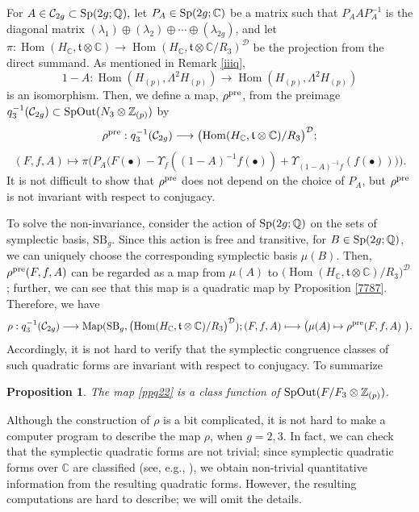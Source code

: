 \documentclass{article}
\theoremstyle{plain}
\newtheorem{prop}[thm]{Proposition}
\theoremstyle{definition}
\def\Hom{\mathop{\mathrm{Hom}}\nolimits}
\newcommand{\lra}{\longrightarrow}
\newcommand{\ra}{\rightarrow}
\newcommand{\Q}{{\Bbb Q}}
\newcommand{\Z}{{\Bbb Z}}
\newcommand{\Sp}{{\rm Sp}}
\newcommand{\SpOut}{{\rm SpOut}}
\begin{document}
{For $A \in \mathcal{C}_{2g} \subset \Sp(2g;\Q), $ let $P_A \in \Sp( 2g;\mathbb{C})$ be a matrix such that $ P_A A P_A^{-1}$ is the diagonal matrix $(\lambda_1) \oplus (\lambda_2)\oplus\cdots \oplus (\lambda_{2g})$, and let $\pi: \Hom(H_{\mathbb{C}}, \mathfrak{t}\otimes \mathbb{C} ) \ra \Hom(H_{\mathbb{C}}, \mathfrak{t}\otimes \mathbb{C} /R_3)^{\mathcal{D}}$ be the projection from the direct summand. As mentioned in Remark \ref{iiiq}, 
\[1-A: \Hom( H_{(p)}, \Lambda^2 H_{(p)} ) \lra \Hom( H_{(p)}, \Lambda^2 H_{(p)} )\]
is an isomorphism. Then, we define a map, $\rho^{\rm pre}$, from the preimage $q_3^{-1}(\mathcal{C}_{2g} ) \subset \mathrm{SpOut}( N_3 \otimes \Z_{(p)} )$ by
\[\rho^{\rm pre}: q_3^{-1}(\mathcal{C}_{2g} ) \lra \bigl( \Hom(H_{\mathbb{C}}, \mathfrak{t}\otimes \mathbb{C} ) /R_3\bigr)^{\mathcal{D}}; \]
\[ (F,f,A) \longmapsto \pi \bigl(P_A \bigl(F(\bullet) -\Upsilon_f((1-A)^{-1} f(\bullet))+ \Upsilon_{(1-A)^{-1}f}(f (\bullet)) \bigr) \bigr). \]
It is not difficult to show that $\rho^{\rm pre} $ does not depend on the choice of $ P_A$, but $\rho^{\rm pre} $ is not invariant with respect to conjugacy.



To solve the non-invariance, consider the action of $\Sp(2g;\Q)$ on the sets of symplectic basis, $\mathrm{SB}_g$. Since this action is free and transitive, for $B \in \Sp(2g;\Q)$, we can uniquely choose the corresponding symplectic basis $\mu(B) $. Then, $ \rho^{\rm pre}(F,f, A)$ can be regarded as a map from $\mu(A)$ to $\bigl( \Hom(H_{\mathbb{C}}, \mathfrak{t}\otimes \mathbb{C} ) /R_3\bigr)^{\mathcal{D}} $; further, we can see that this map is a quadratic map by Proposition \ref{7787}. Therefore, we have
\[ \rho: q_3^{-1}(\mathcal{C}_{2g} ) \lra \mathrm{Map}( \mathrm{SB}_g , \bigl( \Hom(H_{\mathbb{C}}, \mathfrak{t}\otimes \mathbb{C} ) /R_3\bigr)^{\mathcal{D}}) ; (F,f,A) \longmapsto \bigl( \mu(A) \mapsto \rho^{\rm pre}(F,f,A) \ \bigr) . \]
Accordingly, it is not hard to verify that the symplectic congruence classes of such quadratic forms are invariant with respect to conjugacy. To summarize
\begin{prop}
The map \eqref{ppq22} is a class function of $\SpOut( F/F_3 \otimes \Z_{(p)})$.
\end{prop}
Although the construction of $\rho$ is a bit complicated, it is not hard to make a computer program to describe the map $\rho$, when $g=2,3$. In fact, we can check that the symplectic quadratic forms are not trivial; since symplectic quadratic forms over $\mathbb{C}$ are classified (see, e.g., \cite{BHSS}), we obtain non-trivial quantitative information from the resulting quadratic forms. However, the resulting computations are hard to describe; we will omit the details.




}
\end{document}
